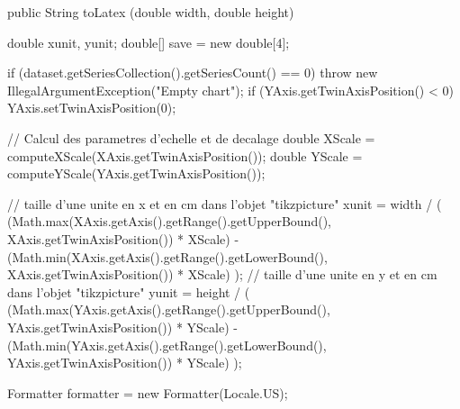 \begin{code}

   public String toLatex (double width, double height) \begin{hide} {
      double xunit, yunit;
      double[] save = new double[4];

      if (dataset.getSeriesCollection().getSeriesCount() == 0)
         throw new IllegalArgumentException("Empty chart");
      if (YAxis.getTwinAxisPosition() < 0)
         YAxis.setTwinAxisPosition(0);

      // Calcul des parametres d'echelle et de decalage
      double XScale = computeXScale(XAxis.getTwinAxisPosition());
      double YScale = computeYScale(YAxis.getTwinAxisPosition());

      // taille d'une unite en x et en cm dans l'objet "tikzpicture"
      xunit = width / ( (Math.max(XAxis.getAxis().getRange().getUpperBound(), XAxis.getTwinAxisPosition()) * XScale) - (Math.min(XAxis.getAxis().getRange().getLowerBound(), XAxis.getTwinAxisPosition()) * XScale) );
      // taille d'une unite en y et en cm dans l'objet "tikzpicture"
     yunit = height / ( (Math.max(YAxis.getAxis().getRange().getUpperBound(), YAxis.getTwinAxisPosition()) * YScale) - (Math.min(YAxis.getAxis().getRange().getLowerBound(), YAxis.getTwinAxisPosition()) * YScale) );

      Formatter formatter = new Formatter(Locale.US);

}
\end{hide}
\end{code}
